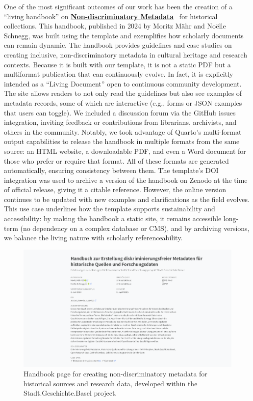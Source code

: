 \documentclass[final]{anthology-ch} %
\begin{document}
One of the most significant outcomes of our work has been the creation of a ``living handbook'' on \href{https://maehr.github.io/diskriminierungsfreie-metadaten/}{\textbf{Non-discriminatory Metadata}}~\cite{maehr2024d} for historical collections. This handbook, published in 2024 by Moritz Mähr and Noëlle Schnegg, was built using the template and exemplifies how scholarly documents can remain dynamic. The handbook provides guidelines and case studies on creating inclusive, non-discriminatory metadata in cultural heritage and research contexts. Because it is built with our template, it is not a static PDF but a multiformat publication that can continuously evolve. In fact, it is explicitly intended as a ``Living Document'' open to continuous community development. The site allows readers to not only read the guidelines but also see examples of metadata records, some of which are interactive (e.g., forms or JSON examples that users can toggle). We included a discussion forum via the GitHub issues integration, inviting feedback or contributions from librarians, archivists, and others in the community. Notably, we took advantage of Quarto's multi-format output capabilities to release the handbook in multiple formats from the same source: an HTML website, a downloadable PDF, and even a Word document for those who prefer or require that format. All of these formats are generated automatically, ensuring consistency between them. The template's DOI integration was used to archive a version of the handbook on Zenodo at the time of official release, giving it a citable reference. However, the online version continues to be updated with new examples and clarifications as the field evolves. This use case underlines how the template supports sustainability and accessibility: by making the handbook a static site, it remains accessible long-term (no dependency on a complex database or CMS), and by archiving versions, we balance the living nature with scholarly referenceability.

\begin{figure}[t!]
  \centering
  \includegraphics[width=0.9\linewidth]{figures/diskriminierungsfreie_metadaten.png}
  \caption{Handbook page for creating non-discriminatory metadata for historical sources and research data, developed within the Stadt.Geschichte.Basel project.}
  \label{fig-discriminationfree-metadata}
\end{figure}
\end{document}
